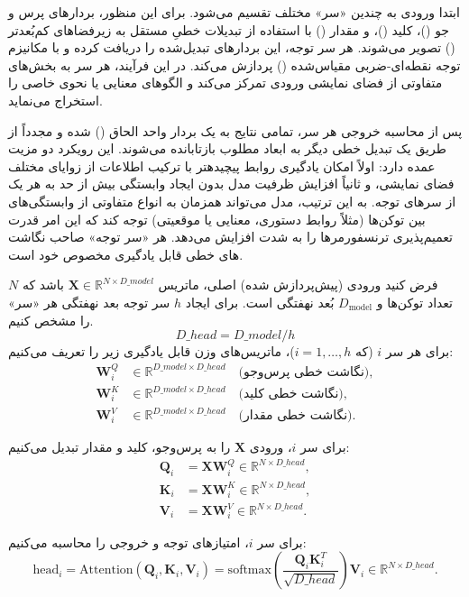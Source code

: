 ابتدا ورودی به چندین «سر» مختلف تقسیم می‌شود. برای این منظور، بردارهای پرس و جو ()، کلید ()، و مقدار () با استفاده از تبدیلات خطیِ مستقل به زیرفضاهای کم‌بُعدتر () تصویر می‌شوند. هر سر توجه، این بردارهای تبدیل‌شده را دریافت کرده و با مکانیزم توجه نقطه‌ای-ضربی مقیاس‌شده () پردازش می‌کند. در این فرآیند، هر سر به بخش‌های متفاوتی از فضای نمایشی ورودی تمرکز می‌کند و الگوهای معنایی یا نحوی خاصی را استخراج می‌نماید.

پس از محاسبه خروجی هر سر، تمامی نتایج به یک بردار واحد الحاق () شده و مجدداً از طریق یک تبدیل خطی دیگر به ابعاد مطلوب بازتابانده می‌شوند. این رویکرد دو مزیت عمده دارد: اولاً امکان یادگیری روابط پیچیدهتر با ترکیب اطلاعات از زوایای مختلف فضای نمایشی، و ثانیاً افزایش ظرفیت مدل بدون ایجاد وابستگی بیش از حد به هر یک از سرهای توجه. به این ترتیب، مدل می‌تواند همزمان به انواع متفاوتی از وابستگی‌های بین توکن‌ها (مثلاً روابط دستوری، معنایی یا موقعیتی) توجه کند که این امر قدرت تعمیم‌پذیری ترنسفورمرها را به شدت افزایش می‌دهد. هر «سر توجه» صاحب نگاشت های خطی قابل یادگیری مخصوص خود است.

فرض کنید ورودی (پیش‌پردازش شده) اصلی، ماتریس 
$\mathbf{X} \in \mathbb{R}^{N \times D\_{model}}$
باشد که 
$N$ تعداد توکن‌ها و 
$D_{\text{model}}$ 
بُعد نهفتگی است. برای ایجاد $h$ سر توجه بعد نهفتگی هر «سر» را مشخص کنیم.
$$
D\_{head} = D\_{model} / h
$$
برای هر سر \(i\) (که \(i = 1, \dots, h\))، ماتریس‌های وزن قابل یادگیری زیر را تعریف می‌کنیم:  
\begin{align*}
	\mathbf{W}_i^Q &\in \mathbb{R}^{D\_{model} \times D\_{head}} \quad \text{(نگاشت خطی پرس‌وجو)}, \\
	\mathbf{W}_i^K &\in \mathbb{R}^{D\_{model} \times D\_{head}} \quad \text{(نگاشت خطی کلید)}, \\
	\mathbf{W}_i^V &\in \mathbb{R}^{D\_{model} \times D\_{head}} \quad \text{(نگاشت خطی مقدار)}.
\end{align*}

برای سر \(i\)، ورودی \(\mathbf{X}\) را به پرس‌وجو، کلید و مقدار تبدیل می‌کنیم:  
\begin{align*}
	\mathbf{Q}_i &= \mathbf{X} \mathbf{W}_i^Q \in \mathbb{R}^{N \times D\_{head}}, \\
	\mathbf{K}_i &= \mathbf{X} \mathbf{W}_i^K \in \mathbb{R}^{N \times D\_{head}}, \\
	\mathbf{V}_i &= \mathbf{X} \mathbf{W}_i^V \in \mathbb{R}^{N \times D\_{head}}.
\end{align*}

برای سر \(i\)، امتیازهای توجه و خروجی را محاسبه می‌کنیم:  
$$
\text{head}_i = \text{Attention}(\mathbf{Q}_i, \mathbf{K}_i, \mathbf{V}_i) = \text{softmax}\left(\frac{\mathbf{Q}_i \mathbf{K}_i^T}{\sqrt{D\_{head}}}\right) \mathbf{V}_i \in \mathbb{R}^{N \times D\_{head}}.
$$

